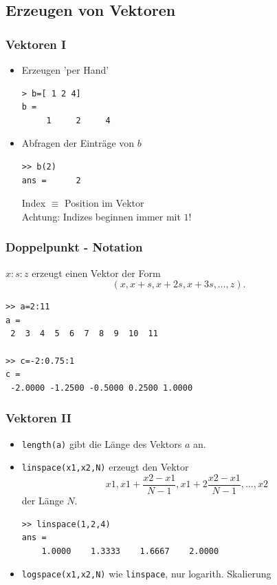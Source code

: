 \subsection{Erzeugen von Vektoren}
%
%
\begin{frame}[fragile]\frametitle{Vektoren I}
\begin{itemize}
\item Erzeugen 'per Hand'
\begin{lstlisting}
> b=[ 1 2 4]
b =
     1     2     4
\end{lstlisting}
\item Abfragen der Einträge von $b$
\begin{lstlisting}
>> b(2)
ans =      2
\end{lstlisting}
Index $\equiv$ Position im Vektor\\

\alert{Achtung}: Indizes beginnen immer mit $1$!

\end{itemize}
\end{frame}

%
%
\begin{frame}[fragile]\frametitle{Doppelpunkt - Notation}
$x:s:z$ erzeugt einen Vektor der Form 
\[ (x,x+s,x+2s,x+3s, \ldots , z). \]
\begin{lstlisting}
>> a=2:11
a =
 2  3  4  5  6  7  8  9  10  11

>> c=-2:0.75:1
c =
 -2.0000 -1.2500 -0.5000 0.2500 1.0000
\end{lstlisting}
\end{frame} 

%
%
\begin{frame}[fragile]\frametitle{Vektoren II}
\begin{itemize}
\item \lstinline!length(a)! gibt die Länge des Vektors $a$ an.
\item \lstinline!linspace(x1,x2,N)! erzeugt den Vektor
\[ x1, x1+\frac{x2-x1}{N-1}, x1+2 \frac{x2-x1}{N-1}, \dots ,x2  \]
der Länge $N$.
\begin{lstlisting}
>> linspace(1,2,4)
ans =
    1.0000    1.3333    1.6667    2.0000
\end{lstlisting}
\item \lstinline!logspace(x1,x2,N)! wie \lstinline!linspace!, nur logarith. Skalierung
\end{itemize}
\end{frame}

